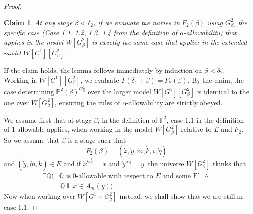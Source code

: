 \documentclass[10pt,a4paper]{amsart}
\newtheorem{comment}{Comment}
\newtheorem{claim}{Claim}
\newcommand{\forceP}{\mathbb{P}}
\newcommand{\forceQ}{\mathbb{Q}}
\begin{document}
\begin{proof}
\begin{claim}
At any stage $\beta < \delta_2$, if we evaluate the names in $F_2(\beta)$ using $G^2_\beta$, the specific case (Case 1.1, 1.2, 1.3, 1.4 from the definition of $\alpha$-allowability) that applies in the model $W[G^2_\beta]$ is exactly the same case that applies in the extended model $W[G^1][G^2_\beta]$.
\end{claim}


If the claim holds, the lemma follows immediately by induction on $\beta < \delta_2$. Working in $W[G^1][G^2_\beta]$, we evaluate $F(\delta_1 + \beta) = F_2(\beta)$. By the claim, the case determining $\mathbb{P}^2(\beta)^{G^2_\beta}$ over the larger model $W[G^1][G^2_\beta]$ is identical to the one over $W[G^2_\beta]$, ensuring the rules of $\alpha$-allowability are strictly obeyed.



\medskip

We assume first that at stage $\beta$, in the definition of $ \forceP^2$,  case 1.1 in the definition of 1-allowable applies, when working in the model $W[G^2_{\beta}]$ relative to $E$ and $F_2$. So we assume that $\beta$ is a stage such that
\[ F_2(\beta) = (\dot{x},\dot{y},\dot{m},\dot{k},i,\dot{\eta}) \]
and $(\dot{y},\dot{m},\dot{k}) \in E$ and if $\dot{x}^{G^2_{\beta}}=x$ and $\dot{y}^{G^2_{\beta}}=y$, the universe $W[ G^2_{\beta}]$ thinks that
\begin{align*}
\exists \forceQ (&\forceQ \text{ is } 0 \text{-allowable with respect to } E \text{ and some F' }\,  \land \\& \, \forceQ \Vdash {x} \in A_m({y})).
\end{align*}
Now when working over $W[G^1 \times G^2_{\beta}]$ instead, we shall show that
we are still in case 1.1.


\end{proof}
\end{document}
